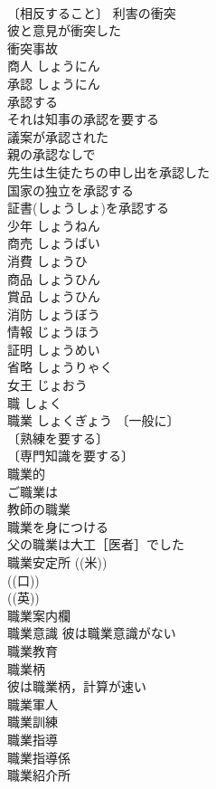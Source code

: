 \documentclass[8pt]{extreport}
\begin{document}
\begin{CJK}{UTF8}{min}
\\	〔相反すること〕 利害の衝突 
\\	彼と意見が衝突した 
\\	衝突事故 
\\	商人	しょうにん	
\\	承認	しょうにん	
\\	承認する 
\\	それは知事の承認を要する 
\\	議案が承認された 
\\	親の承認なしで 
\\	先生は生徒たちの申し出を承認した 
\\	国家の独立を承認する 
\\	証書(しょうしょ)を承認する 
\\	少年	しょうねん	
\\	商売	しょうばい	
\\	消費	しょうひ	
\\	商品	しょうひん	
\\	賞品	しょうひん	
\\	消防	しょうぼう	
\\	情報	じょうほう	
\\	証明	しょうめい	
\\	省略	しょうりゃく	
\\	女王	じょおう	
\\	職	しょく	
\\	職業	しょくぎょう	〔一般に〕
\\	〔熟練を要する〕
\\	〔専門知識を要する〕
\\	職業的 
\\	ご職業は 
\\	教師の職業 
\\	職業を身につける 
\\	父の職業は大工［医者］でした 
\\	職業安定所 ((米)) 
\\	((口)) 
\\	((英)) 
\\	職業案内欄 
\\	職業意識 彼は職業意識がない 
\\	職業教育 
\\	職業柄　
\\	彼は職業柄，計算が速い 
\\	職業軍人 
\\	職業訓練 
\\	職業指導 
\\	職業指導係 
\\	職業紹介所 

\end{CJK}
\end{document}
